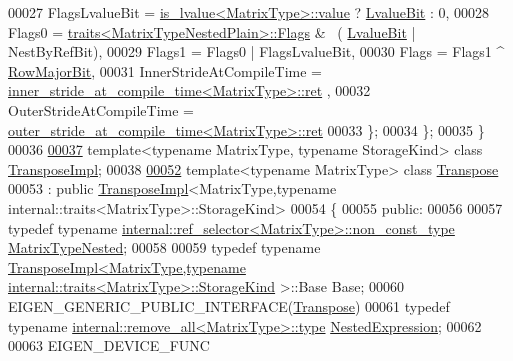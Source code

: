 \begin{DoxyCode}
00027     FlagsLvalueBit = \hyperlink{struct_eigen_1_1internal_1_1is__lvalue}{is\_lvalue<MatrixType>::value} ? 
      \hyperlink{group__flags_gae2c323957f20dfdc6cb8f44428eaec1a}{LvalueBit} : 0,
00028     Flags0 = \hyperlink{struct_eigen_1_1internal_1_1traits}{traits<MatrixTypeNestedPlain>::Flags} & ~(
      \hyperlink{group__flags_gae2c323957f20dfdc6cb8f44428eaec1a}{LvalueBit} | NestByRefBit),
00029     Flags1 = Flags0 | FlagsLvalueBit,
00030     Flags = Flags1 ^ \hyperlink{group__flags_gae4f56c2a60bbe4bd2e44c5b19cbe8762}{RowMajorBit},
00031     InnerStrideAtCompileTime = \hyperlink{struct_eigen_1_1internal_1_1inner__stride__at__compile__time}{inner\_stride\_at\_compile\_time<MatrixType>::ret}
      ,
00032     OuterStrideAtCompileTime = \hyperlink{struct_eigen_1_1internal_1_1outer__stride__at__compile__time}{outer\_stride\_at\_compile\_time<MatrixType>::ret}
00033   \};
00034 \};
00035 \}
00036 
\hyperlink{class_eigen_1_1_transpose_impl}{00037} \textcolor{keyword}{template}<\textcolor{keyword}{typename} MatrixType, \textcolor{keyword}{typename} StorageKind> \textcolor{keyword}{class }\hyperlink{class_eigen_1_1_transpose_impl}{TransposeImpl};
00038 
\hyperlink{group___core___module}{00052} \textcolor{keyword}{template}<\textcolor{keyword}{typename} MatrixType> \textcolor{keyword}{class }\hyperlink{group___core___module_class_eigen_1_1_transpose}{Transpose}
00053   : \textcolor{keyword}{public} \hyperlink{class_eigen_1_1_transpose_impl}{TransposeImpl}<MatrixType,typename internal::traits<MatrixType>::StorageKind>
00054 \{
00055   \textcolor{keyword}{public}:
00056 
00057     \textcolor{keyword}{typedef} \textcolor{keyword}{typename} \hyperlink{class_eigen_1_1internal_1_1_tensor_lazy_evaluator_writable}{internal::ref\_selector<MatrixType>::non\_const\_type}
       \hyperlink{class_eigen_1_1internal_1_1_tensor_lazy_evaluator_writable}{MatrixTypeNested};
00058 
00059     \textcolor{keyword}{typedef} \textcolor{keyword}{typename} 
      \hyperlink{class_eigen_1_1_transpose_impl}{TransposeImpl<MatrixType,typename internal::traits<MatrixType>::StorageKind}
      >::Base Base;
00060     EIGEN\_GENERIC\_PUBLIC\_INTERFACE(\hyperlink{group___core___module_class_eigen_1_1_transpose}{Transpose})
00061     \textcolor{keyword}{typedef} \textcolor{keyword}{typename} \hyperlink{group___sparse_core___module}{internal::remove\_all<MatrixType>::type} 
      \hyperlink{group___sparse_core___module}{NestedExpression};
00062 
00063     EIGEN\_DEVICE\_FUNC

\end{DoxyCode}
